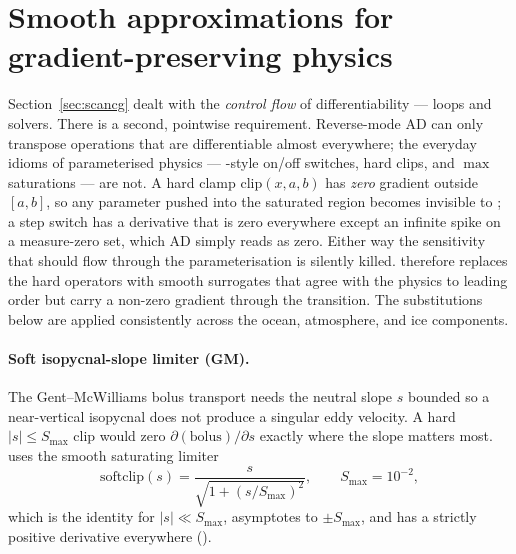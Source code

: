 \section{Smooth approximations for gradient-preserving physics}
\label{sec:adsafe_substitutions}

Section~\ref{sec:scancg} dealt with the \emph{control flow} of differentiability --- loops and
solvers. There is a second, pointwise requirement. Reverse-mode AD can only transpose operations
that are differentiable almost everywhere; the everyday idioms of parameterised physics ---
-style on/off switches, hard clips, and $\max$ saturations --- are not. A hard clamp
$\mathrm{clip}(x,a,b)$ has \emph{zero} gradient outside $[a,b]$, so any parameter pushed into the
saturated region becomes invisible to ; a step switch has a derivative that is zero
everywhere except an infinite spike on a measure-zero set, which AD simply reads as zero. Either way
the sensitivity that should flow through the parameterisation is silently killed. \model{} therefore
replaces the hard operators with smooth surrogates that agree with the physics to leading order but
carry a non-zero gradient through the transition. The substitutions below are applied consistently
across the ocean, atmosphere, and ice components.

\paragraph{Soft isopycnal-slope limiter (GM).} The Gent--McWilliams bolus transport needs the
neutral slope $s$ bounded so a near-vertical isopycnal does not produce a singular eddy velocity.
A hard $|s|\le S_{\max}$ clip would zero $\partial(\text{bolus})/\partial s$ exactly where the slope
matters most. \model{} uses the smooth saturating limiter
\begin{equation}
  \mathrm{softclip}(s) = \frac{s}{\sqrt{1+(s/S_{\max})^{2}}},
  \qquad S_{\max}=10^{-2},
  \label{eq:softclip-slope}
\end{equation}
which is the identity for $|s|\ll S_{\max}$, asymptotes to $\pm S_{\max}$, and has a strictly
positive derivative everywhere
().

